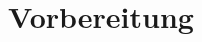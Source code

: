 \documentclass{include/protokollclass}
\begin{document}
    \FrontMatter


    \begingroup \let\clearpage\relax    %
    \tableofcontents                    %
    \listoffigures
    \listoftables
    \endgroup



    \MainMatter
    
            



    \chapter{Vorbereitung}
    


	\begingroup
	\let\clearpage\relax

    \TheBibliography

    
    

    \endgroup
\end{document}
